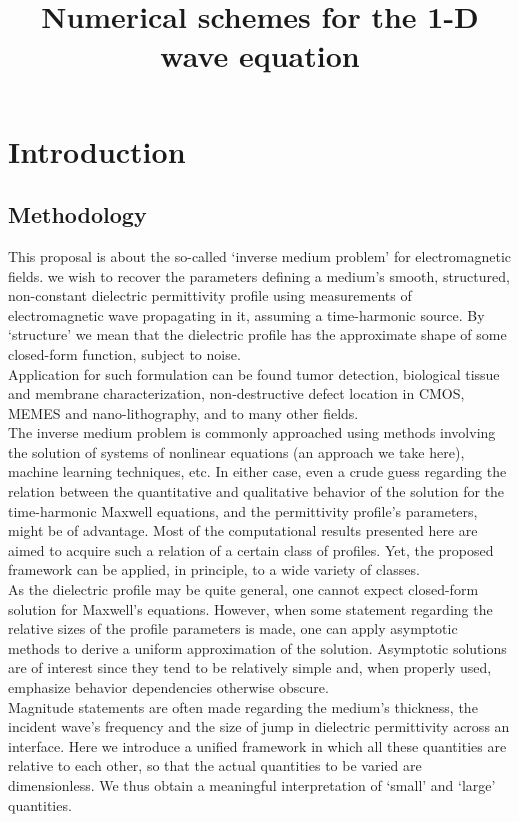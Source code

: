 \documentclass[12pt,twoside]{report}
\begin{document}
\title{Numerical schemes for the 1-D wave equation}

\newpage
\chapter{Introduction}
\section{Methodology  }
\label{sec:methodology}

This proposal is about the so-called `inverse medium problem' for electromagnetic fields. we wish to recover the parameters defining a medium's smooth, structured, non-constant dielectric permittivity profile using measurements of electromagnetic wave propagating in it, assuming a time-harmonic source. By `structure' we mean that the dielectric profile has the approximate shape of some closed-form function, subject to noise. \\
Application for such formulation can be found tumor detection, biological tissue and membrane characterization, non-destructive defect location in CMOS, MEMES and nano-lithography, and to many other fields.\\

The inverse medium problem is commonly approached using methods involving the solution of systems of nonlinear equations (an approach we take here), machine learning techniques, etc. In either case, even a crude guess regarding the relation between the quantitative and qualitative behavior of the solution for the time-harmonic Maxwell equations, and the permittivity profile's parameters, might be of advantage. Most of the computational results presented here are aimed to acquire such a relation of a certain class of profiles. Yet, the proposed framework can be applied, in principle, to a wide variety of classes.\\

As the dielectric profile may be quite general, one cannot expect closed-form solution for Maxwell's equations. However, when some statement regarding the relative sizes of the profile parameters is made, one can apply asymptotic methods to derive a uniform approximation of the solution. Asymptotic solutions are of interest since they tend to be relatively simple and, when properly used, emphasize behavior dependencies otherwise obscure.\\
Magnitude statements are often made regarding the medium's thickness, the incident wave's frequency and the size of jump in dielectric permittivity across an interface. Here we introduce a unified framework in which all these quantities are relative to each other, so that the actual quantities to be varied are dimensionless. We thus obtain a meaningful interpretation of `small' and `large' quantities.\\
\end{document}
